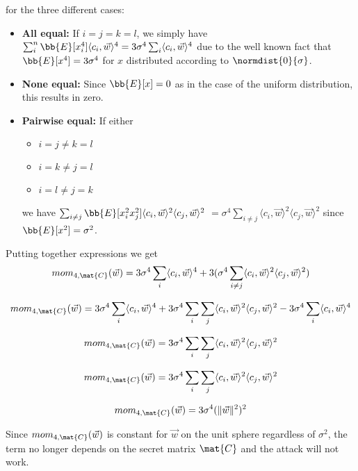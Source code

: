     for the three different cases:
    \begin{itemize}
        \item \textbf{All equal: } If $i = j = k = l$, we simply have $\sum_i^n \bb{E}[x_i^4] \langle c_i, \vec{w} \rangle ^4 = 3 \sigma ^4 \sum_i \langle c_i, \vec{w} \rangle ^4$
            due to the well known fact that $\bb{E}[x^4] = 3 \sigma ^4$ for $x$ distributed according to $\normdist{0}{\sigma}$.
        \item \textbf{None equal:} Since $\bb{E}[x] = 0$ as in the case of the uniform distribution, this results in zero.
        \item \textbf{Pairwise equal:} If either 
            \begin{itemize}
                \item $i = j \neq k = l$
                \item $i = k \neq j = l$ 
                \item $i = l \neq j = k$
            \end{itemize}
            we have $\sum_{i \neq j} \bb{E}[x_i^2 x_j^2] \langle c_i, \vec{w} \rangle ^2 \langle c_j, \vec{w} \rangle ^2$
            $= \sigma^4 \sum_{i \neq j}\langle c_i, \vec{w} \rangle ^2 \langle c_j, \vec{w} \rangle ^2$ since $\bb{E}[x^2] = \sigma^2$.
    \end{itemize}

    Putting together expressions we get 
    \[
        mom_{4, \mat{C}}(\vec{w}) = 3 \sigma ^4 \sum_i \langle c_i, \vec{w} \rangle ^4 + 3(\sigma^4 \sum_{i \neq j}\langle c_i, \vec{w} \rangle ^2 \langle c_j, \vec{w} \rangle ^2)
    \]

    \[
        mom_{4, \mat{C}}(\vec{w}) = 3 \sigma ^4 \sum_i \langle c_i, \vec{w} \rangle ^4 
        + 3\sigma^4 \sum_{i} \sum_{j} \langle c_i, \vec{w} \rangle ^2 \langle c_j, \vec{w} \rangle ^2
        - 3\sigma^4 \sum_{i} \langle c_i, \vec{w} \rangle ^4
    \]

    \[
        mom_{4, \mat{C}}(\vec{w}) = 3\sigma^4 \sum_{i} \sum_{j} \langle c_i, \vec{w} \rangle ^2 \langle c_j, \vec{w} \rangle ^2
    \]

    \[
        mom_{4, \mat{C}}(\vec{w}) = 3\sigma^4 \sum_{i} \sum_{j} \langle c_i, \vec{w} \rangle ^2 \langle c_j, \vec{w} \rangle ^2
    \]

    \[
        mom_{4, \mat{C}}(\vec{w}) = 3\sigma^4 (\lVert \vec{w} \rVert ^2 ) ^2
    \]

    Since $mom_{4, \mat{C}}(\vec{w})$ is constant for $\vec{w}$ on the unit sphere regardless of $\sigma^2$, the term no longer depends on the secret matrix $\mat{C}$ and the attack will not work.
